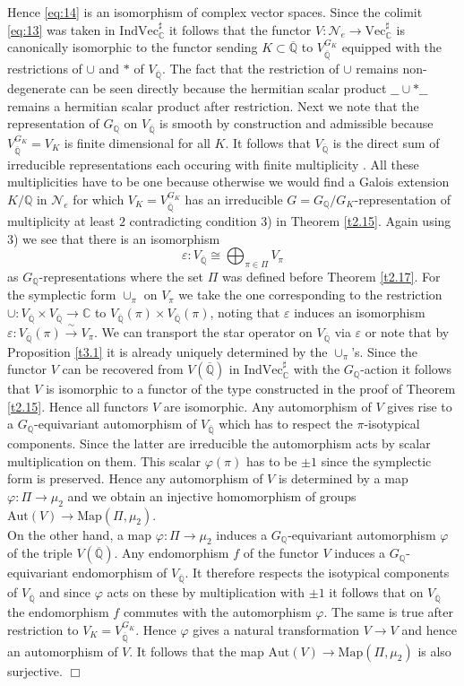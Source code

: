 \documentclass[12pt,leqno]{article}
\newcommand{\C}{{\mathbb{C}}}
\newcommand{\Q}{{\mathbb{Q}}}
\newcommand{\oQ}{\overline{\Q}}
\newcommand{\Map}{\mathrm{Map}}
\newcommand{\Aut}{\mathrm{Aut}}
\newcommand{\nVec}{\mathrm{Vec}}
\newcommand{\Nh}{{\mathcal N}}
\newcommand{\silo}{\xrightarrow{\,\sim\,}}
\newcommand{\Ind}{\mathrm{Ind}}
\newenvironment{proofof}{\noindent {\bf Proof of}}{\mbox{}\hspace*{\fill}$\Box$}
\begin{document}
\begin{proofof}
Hence \eqref{eq:14} is an isomorphism of complex vector spaces. Since the colimit \eqref{eq:13} was taken in $\Ind \nVec^{\sharp}_{\C}$ it follows that the functor $V : \Nh_e \to \nVec^{\sharp}_{\C}$ is canonically isomorphic to the functor sending $K \subset \oQ$ to $V^{G_K}_{\oQ}$ equipped with the restrictions of $\cup$ and $*$ of $V_{\oQ}$. The fact that the restriction of $\cup$ remains non-degenerate can be seen directly because the hermitian scalar product $\_\_ \cup * \_\_ $ remains a hermitian scalar product after restriction. Next we note that the representation of $G_{\Q}$ on $V_{\oQ}$ is smooth by construction and admissible because $V^{G_K}_{\oQ} = V_K$ is finite dimensional for all $K$. It follows that $V_{\oQ}$ is the direct sum of irreducible representations each occuring with finite multiplicity \cite[II.1.5. Proposition]{C}. All these multiplicities have to be one because otherwise we would find a Galois extension $K / \Q$ in $\Nh_e$ for which $V_K = V^{G_K}_{\oQ}$ has an irreducible $G = G_{\Q} / G_K$-representation of multiplicity at least $2$ contradicting condition 3) in Theorem \ref{t2.15}. Again using 3) we see that there is an isomorphism
\[
\varepsilon : V_{\oQ} \cong \bigoplus_{\pi \in \Pi} V_{\pi}
\]
as $G_{\Q}$-representations where the set $\Pi$ was defined before Theorem \ref{t2.17}. For the symplectic form $\cup_{\pi}$ on $V_{\pi}$ we take the one corresponding to the restriction $\cup : V_{\oQ} \times V_{\oQ} \to \C$ to $V_{\oQ} (\pi) \times V_{\oQ} (\pi)$, noting that $\varepsilon$ induces an isomorphism $\varepsilon : V_{\oQ} (\pi) \silo V_{\pi}$. We can transport the star operator on $V_{\oQ}$ via $\varepsilon$ or note that by Proposition \ref{t3.1} it is already uniquely determined by the $\cup_{\pi}$'s. Since the functor $V$ can be recovered from $V (\oQ)$ in $\Ind \nVec^{\sharp}_{\C}$ with the $G_{\Q}$-action it follows that $V$ is isomorphic to a functor of the type constructed in the proof of Theorem \ref{t2.15}. Hence all functors $V$ are isomorphic. Any automorphism  of $V$ gives rise to a $G_{\Q}$-equivariant automorphism of $V_{\oQ}$ which has to respect the $\pi$-isotypical components. Since the latter are irreducible the automorphism acts by scalar multiplication on them. This scalar $\varphi (\pi)$ has to be $\pm 1$ since the symplectic form is preserved. Hence any automorphism of $V$ is determined by a map $\varphi : \Pi \to \mu_2$ and we obtain an injective homomorphism of groups $\Aut (V) \to \Map (\Pi , \mu_2)$. \\
On the other hand, a map $\varphi : \Pi \to \mu_2$ induces a $G_{\Q}$-equivariant automorphism $\varphi$ of the triple $V (\oQ)$. Any endomorphism $f$ of the functor $V$ induces a $G_{\Q}$-equivariant endomorphism of $V_{\oQ}$. It therefore respects the isotypical components of $V_{\oQ}$ and since $\varphi$ acts on these by multiplication with $\pm 1$ it follows that on $V_{\oQ}$ the endomorphism $f$ commutes with the automorphism $\varphi$. The same is true after restriction to $V_K = V^{G_K}_{\oQ}$. Hence $\varphi$ gives a natural transformation $V \to V$ and hence an automorphism of $V$. It follows that the map $\Aut (V) \to \Map (\Pi , \mu_2)$ is also surjective.
\end{proofof}
%
\end{document}
